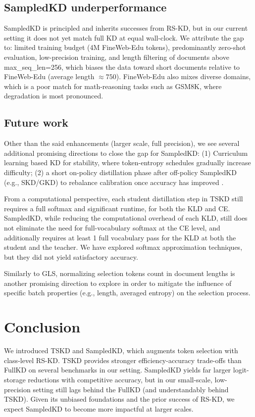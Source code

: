 \documentclass[11pt]{article}
\begin{document}
\subsection{SampledKD underperformance}
SampledKD is principled and inherits successes from RS-KD, but in our current setting it does not yet match full KD at equal wall-clock.
We attribute the gap to: limited training budget (4M FineWeb-Edu tokens), predominantly zero-shot evaluation, low-precision training, and length filtering of documents above max\_seq\_len=256, which biases the data toward short documents relative to FineWeb-Edu (average length $\approx750$).
FineWeb-Edu also mixes diverse domains, which is a poor match for math-reasoning tasks such as GSM8K, where degradation is most pronounced.

\subsection{Future work}
Other than the said enhancements (larger scale, full precision), we see several additional promising directions to close the gap for SampledKD:
(1) Curriculum learning based KD for stability, where token-entropy schedules gradually increase difficulty;
(2) a short on-policy distillation phase after off-policy SampledKD (e.g., SKD/GKD) to rebalance calibration once accuracy has improved \citep{xu2024speculative}.

From a computational perspective, each student distillation step in TSKD still requires a full softmax and significant runtime, for both the KLD and CE.
SampledKD, while reducing the computational overhead of each KLD, still does not eliminate the need for full-vocabulary softmax at the CE level, and additionally requires at least 1 full vocabulary pass for the KLD at both the student and the teacher.
We have explored softmax approximation techniques, but they did not yield satisfactory accuracy.

Similarly to GLS, normalizing selection tokens count in document lengths is another promising direction to explore in order to mitigate the influence of specific batch properties (e.g., length, averaged entropy) on the selection process.

\section{Conclusion}
\label{sec:conclusion}
We introduced TSKD and SampledKD, which augments token selection with class-level RS-KD.
TSKD provides stronger efficiency-accuracy trade-offs than FullKD on several benchmarks in our setting.
SampledKD yields far larger logit-storage reductions with competitive accuracy, but in our small-scale, low-precision setting still lags behind the FullKD (and understandably behind TSKD).
Given its unbiased foundations and the prior success of RS-KD, we expect SampledKD to become more impactful at larger scales.
\end{document}
